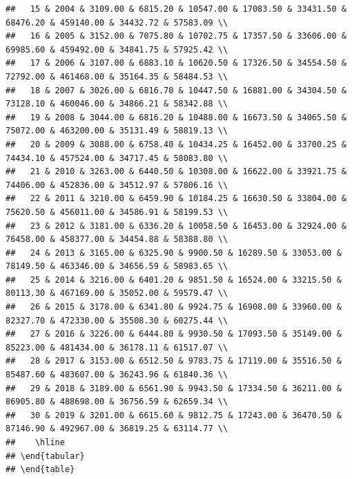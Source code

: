 \documentclass[
]{book}
\begin{document}
\begin{verbatim}
##   15 & 2004 & 3109.00 & 6815.20 & 10547.00 & 17083.50 & 33431.50 & 68476.20 & 459140.00 & 34432.72 & 57583.09 \\ 
##   16 & 2005 & 3152.00 & 7075.80 & 10702.75 & 17357.50 & 33606.00 & 69985.60 & 459492.00 & 34841.75 & 57925.42 \\ 
##   17 & 2006 & 3107.00 & 6883.10 & 10620.50 & 17326.50 & 34554.50 & 72792.00 & 461468.00 & 35164.35 & 58484.53 \\ 
##   18 & 2007 & 3026.00 & 6816.70 & 10447.50 & 16881.00 & 34304.50 & 73128.10 & 460046.00 & 34866.21 & 58342.88 \\ 
##   19 & 2008 & 3044.00 & 6816.20 & 10488.00 & 16673.50 & 34065.50 & 75072.00 & 463200.00 & 35131.49 & 58819.13 \\ 
##   20 & 2009 & 3088.00 & 6758.40 & 10434.25 & 16452.00 & 33700.25 & 74434.10 & 457524.00 & 34717.45 & 58083.80 \\ 
##   21 & 2010 & 3263.00 & 6440.50 & 10308.00 & 16622.00 & 33921.75 & 74406.00 & 452836.00 & 34512.97 & 57806.16 \\ 
##   22 & 2011 & 3210.00 & 6459.90 & 10184.25 & 16630.50 & 33804.00 & 75620.50 & 456011.00 & 34586.91 & 58199.53 \\ 
##   23 & 2012 & 3181.00 & 6336.20 & 10058.50 & 16453.00 & 32924.00 & 76458.00 & 458377.00 & 34454.88 & 58388.80 \\ 
##   24 & 2013 & 3165.00 & 6325.90 & 9900.50 & 16289.50 & 33053.00 & 78149.50 & 463346.00 & 34656.59 & 58983.65 \\ 
##   25 & 2014 & 3216.00 & 6401.20 & 9851.50 & 16524.00 & 33215.50 & 80113.30 & 467169.00 & 35052.00 & 59579.47 \\ 
##   26 & 2015 & 3178.00 & 6341.80 & 9924.75 & 16908.00 & 33960.00 & 82327.70 & 472330.00 & 35508.30 & 60275.44 \\ 
##   27 & 2016 & 3226.00 & 6444.80 & 9930.50 & 17093.50 & 35149.00 & 85223.00 & 481434.00 & 36178.11 & 61517.07 \\ 
##   28 & 2017 & 3153.00 & 6512.50 & 9783.75 & 17119.00 & 35516.50 & 85487.60 & 483607.00 & 36243.96 & 61840.36 \\ 
##   29 & 2018 & 3189.00 & 6561.90 & 9943.50 & 17334.50 & 36211.00 & 86905.80 & 488698.00 & 36756.59 & 62659.34 \\ 
##   30 & 2019 & 3201.00 & 6615.60 & 9812.75 & 17243.00 & 36470.50 & 87146.90 & 492967.00 & 36819.25 & 63114.77 \\ 
##    \hline
## \end{tabular}
## \end{table}
\end{verbatim}
\end{document}
